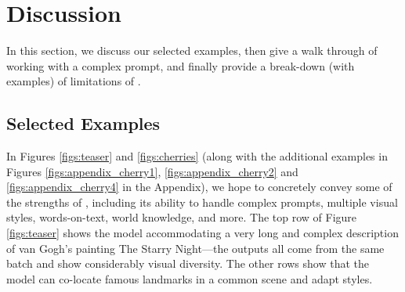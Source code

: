 \section{Discussion}
\label{sec:discussion}

In this section, we discuss our selected examples, then give a walk through of working with a complex prompt, and finally provide a break-down (with examples) of limitations of \bdraw.

\subsection{Selected Examples}
\label{sec:selected_discussion}

In Figures \ref{figs:teaser} and \ref{figs:cherries} (along with the additional examples in Figures \ref{figs:appendix_cherry1}, \ref{figs:appendix_cherry2} and \ref{figs:appendix_cherry4} in the Appendix), we hope to concretely convey some of the strengths of \bdraw, including its ability to handle complex prompts, multiple visual styles, words-on-text, world knowledge, and more. The top row of Figure \ref{figs:teaser} shows the model accommodating a very long and complex description of van Gogh's painting The Starry Night---the outputs all come from the same batch and show considerably visual diversity. The other rows show that the model can co-locate famous landmarks in a common scene and adapt styles.

